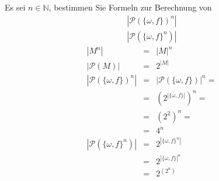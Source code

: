 \documentclass[10pt, oneside]{article}
\begin{document}
Es sei $n \in \mathbb{N}$, bestimmen Sie Formeln zur Berechnung von
\begin{equation*}
    \begin{gathered}
        |\mathcal{P}(\{\omega, f\})^n| \\
        |\mathcal{P}(\{\omega, f\}^n)|
    \end{gathered}
\end{equation*}
\begin{equation*}
    \begin{array}{rcl}
        |M^n| &=& |M|^n \\[5pt]
        |\mathcal{P}(M)| &=& 2^{|M|} \\[10pt]
        |\mathcal{P}(\{\omega, f\})^n| &=& |\mathcal{P}(\{\omega, f\})|^n = \\[5pt]
                                       &=& (2^{|\{\omega, f\}|})^n = \\[5pt]
                                       &=& (2^2)^n = \\[5pt]
                                       &=& 4^n \\[10pt]
        |\mathcal{P}(\{\omega, f\}^n)| &=& 2^{|\{\omega, f\}^n|} \\[5pt]
                                       &=& 2^{|\{\omega, f\}|^n} \\[5pt]
                                       &=& 2^{(2^n)}
    \end{array}
\end{equation*}
\end{document}
